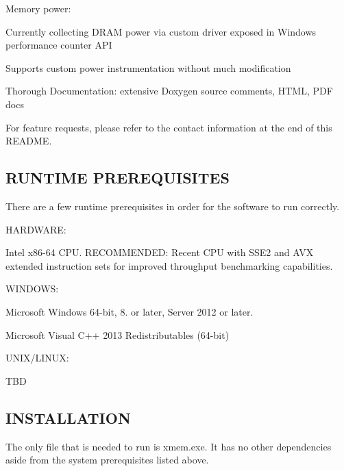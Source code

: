 Memory power\-:
\begin{DoxyItemize}
\item Currently collecting D\-R\-A\-M power via custom driver exposed in Windows performance counter A\-P\-I
\item Supports custom power instrumentation without much modification
\item Thorough Documentation\-: extensive Doxygen source comments, H\-T\-M\-L, P\-D\-F docs
\end{DoxyItemize}

For feature requests, please refer to the contact information at the end of this R\-E\-A\-D\-M\-E. 

 \subsection*{R\-U\-N\-T\-I\-M\-E P\-R\-E\-R\-E\-Q\-U\-I\-S\-I\-T\-E\-S }

There are a few runtime prerequisites in order for the software to run correctly.

H\-A\-R\-D\-W\-A\-R\-E\-:


\begin{DoxyItemize}
\item Intel x86-\/64 C\-P\-U. R\-E\-C\-O\-M\-M\-E\-N\-D\-E\-D\-: Recent C\-P\-U with S\-S\-E2 and A\-V\-X extended instruction sets for improved throughput benchmarking capabilities.
\end{DoxyItemize}

W\-I\-N\-D\-O\-W\-S\-:


\begin{DoxyItemize}
\item Microsoft Windows 64-\/bit, 8. or later, Server 2012 or later.
\item Microsoft Visual C++ 2013 Redistributables (64-\/bit)
\end{DoxyItemize}

U\-N\-I\-X/\-L\-I\-N\-U\-X\-:


\begin{DoxyItemize}
\item T\-B\-D 

 \subsection*{I\-N\-S\-T\-A\-L\-L\-A\-T\-I\-O\-N }
\end{DoxyItemize}

The only file that is needed to run is xmem.\-exe. It has no other dependencies aside from the system prerequisites listed above. 

